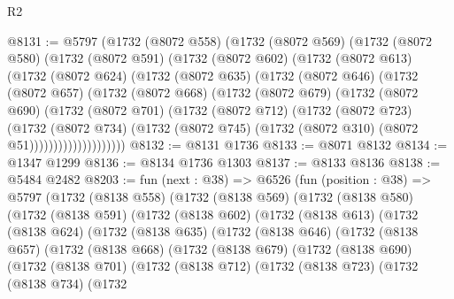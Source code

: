 \begin{lexlean}{R2}
\begin{coremodule}
@8131 := @5797
    (@1732
      (@8072 @558)
      (@1732
        (@8072 @569)
        (@1732
          (@8072 @580)
          (@1732
            (@8072 @591)
            (@1732
              (@8072 @602)
              (@1732
                (@8072 @613)
                (@1732
                  (@8072 @624)
                  (@1732
                    (@8072 @635)
                    (@1732
                      (@8072 @646)
                      (@1732
                        (@8072 @657)
                        (@1732
                          (@8072 @668)
                          (@1732
                            (@8072 @679)
                            (@1732
                              (@8072 @690)
                              (@1732
                                (@8072 @701)
                                (@1732
                                  (@8072 @712)
                                  (@1732
                                    (@8072 @723)
                                    (@1732
                                      (@8072 @734)
                                      (@1732
                                        (@8072 @745)
                                        (@1732 (@8072 @310) (@8072 @51))))))))))))))))))))
@8132 := @8131 @1736
@8133 := @8071 @8132
@8134 := @1347 @1299
@8136 := @8134 @1736 @1303
@8137 := @8133 @8136
@8138 := @5484 @2482
@8203 := fun (next : @38) =>
  @6526
    (fun (position : @38) =>
    @5797
      (@1732
        (@8138 @558)
        (@1732
          (@8138 @569)
          (@1732
            (@8138 @580)
            (@1732
              (@8138 @591)
              (@1732
                (@8138 @602)
                (@1732
                  (@8138 @613)
                  (@1732
                    (@8138 @624)
                    (@1732
                      (@8138 @635)
                      (@1732
                        (@8138 @646)
                        (@1732
                          (@8138 @657)
                          (@1732
                            (@8138 @668)
                            (@1732
                              (@8138 @679)
                              (@1732
                                (@8138 @690)
                                (@1732
                                  (@8138 @701)
                                  (@1732
                                    (@8138 @712)
                                    (@1732
                                      (@8138 @723)
                                      (@1732
                                        (@8138 @734)
                                        (@1732

\end{coremodule}
\end{lexlean}
